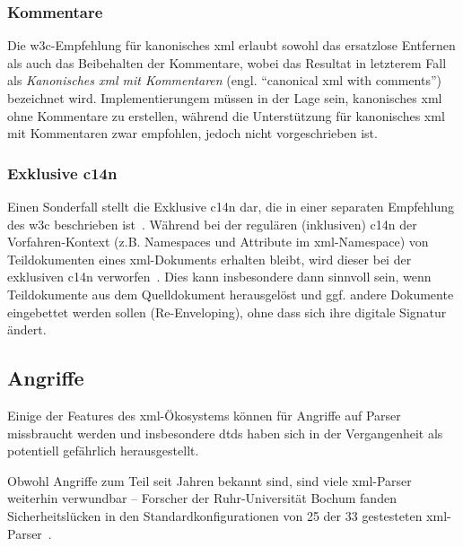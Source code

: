 \subsubsection{Kommentare}
\label{sec:c14ncomments}

Die \gls{w3c}-Empfehlung für kanonisches \acrshort{xml} erlaubt sowohl das ersatzlose Entfernen als auch das Beibehalten der Kommentare, wobei das Resultat in letzterem Fall als \emph{Kanonisches \acrshort{xml} mit Kommentaren} (engl. \enquote{canonical \acrshort{xml} with comments})~\cite[Abschnitt 2.1]{c14n} bezeichnet wird. Implementierungem müssen in der Lage sein, kanonisches \acrshort{xml} ohne Kommentare zu erstellen, während die Unterstützung für kanonisches \acrshort{xml} mit Kommentaren zwar empfohlen, jedoch nicht vorgeschrieben ist.

\subsubsection{Exklusive \acrlong{c14n}}
\label{sec:excc14n}

Einen Sonderfall stellt die Exklusive \acrlong{c14n} dar, die in einer separaten Empfehlung des \gls{w3c} beschrieben ist~\cite{excc14n}. Während bei der regulären (inklusiven) \acrlong{c14n} der Vorfahren-Kontext (z.B. Namespaces und Attribute im \acrshort{xml}-Namespace) von Teildokumenten eines \acrshort{xml}-Dokuments erhalten bleibt, wird dieser bei der exklusiven \acrshort{c14n} verworfen~\cite[Abschnitt~18]{siddiqui2002c14n2}. Dies kann insbesondere dann sinnvoll sein, wenn Teildokumente aus dem Quelldokument herausgelöst und ggf. andere Dokumente eingebettet werden sollen (Re-Enveloping), ohne dass sich ihre digitale Signatur ändert.

\subsection{Angriffe}
\label{sec:xmlattacks}

Einige der Features des \acrshort{xml}-Ökosystems können für Angriffe auf Parser missbraucht werden und insbesondere \glspl{dtd} haben sich in der Vergangenheit als potentiell gefährlich herausgestellt.~\cite[S.~4]{morgan2014xml}

Obwohl Angriffe zum Teil seit Jahren bekannt sind, sind viele \acrshort{xml}-Parser weiterhin verwundbar -- Forscher der Ruhr-Universität Bochum fanden Sicherheitslücken in den Standardkonfigurationen von 25 der 33 gestesteten \acrshort{xml}-Parser~\cite{spaeth2016sok}.


